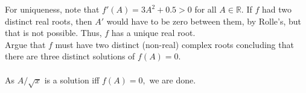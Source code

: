 \documentclass{article}
\begin{document}
\begin{enumerate}[label = Q.\arabic*.]
	For uniqueness, note that $f'(A) = 3A^2 + 0.5 > 0$ for all $A \in \mathbb{R}.$ If $f$ had two distinct real roots, then $A'$ would have to be zero between them, by Rolle's, but that is not possible. Thus, $f$ has a unique real root.\\
	Argue that $f$ must have two distinct (non-real) complex roots concluding that there are three distinct solutions of $f(A) = 0.$\\~\\
	As $A/\sqrt{x}$ is a solution iff $f(A) = 0,$ we are done.
\end{enumerate}
\end{document}
